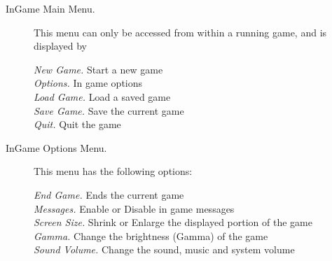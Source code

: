 \begin{description}
  \item[InGame Main Menu. ]This menu can only be accessed from within a running game, and is displayed by

  \emph{New Game. } Start a new game\\
  \emph{Options. } In game options\\
  \emph{Load Game. } Load a saved game\\
  \emph{Save Game. } Save the current game\\
  \emph{Quit. } Quit the game%

  \item[InGame Options Menu. ]This menu has the following options:
  
  \emph{End Game. } Ends the current game\\
  \emph{Messages. }  Enable or Disable in game messages\\
  \emph{Screen Size. } Shrink or Enlarge the displayed portion of the game\\
  \emph{Gamma. } Change the brightness (Gamma) of the game\\
  \emph{Sound Volume. } Change the sound, music and system volume%

\end{description}

